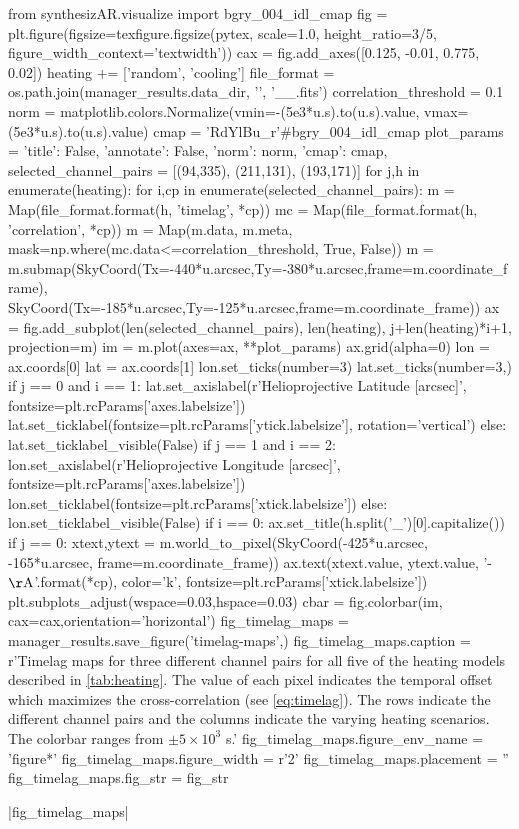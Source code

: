 \begin{pycode}
from synthesizAR.visualize import bgry_004_idl_cmap
fig = plt.figure(figsize=texfigure.figsize(pytex, scale=1.0, height_ratio=3/5,
                                           figure_width_context='textwidth'))
cax = fig.add_axes([0.125, -0.01, 0.775, 0.02])
heating += ['random', 'cooling']
file_format = os.path.join(manager_results.data_dir, '{}', '{}_{}_{}.fits')
correlation_threshold = 0.1
norm = matplotlib.colors.Normalize(vmin=-(5e3*u.s).to(u.s).value,
                                   vmax=(5e3*u.s).to(u.s).value)
cmap = 'RdYlBu_r'#bgry_004_idl_cmap
plot_params = {'title': False, 'annotate': False, 'norm': norm, 'cmap': cmap,}
selected_channel_pairs = [(94,335), (211,131), (193,171)]
for j,h in enumerate(heating):
    for i,cp in enumerate(selected_channel_pairs):
        m = Map(file_format.format(h, 'timelag', *cp))
        mc = Map(file_format.format(h, 'correlation', *cp))
        m = Map(m.data, m.meta, mask=np.where(mc.data<=correlation_threshold, True, False))
        m = m.submap(SkyCoord(Tx=-440*u.arcsec,Ty=-380*u.arcsec,frame=m.coordinate_frame),
                     SkyCoord(Tx=-185*u.arcsec,Ty=-125*u.arcsec,frame=m.coordinate_frame))
        ax = fig.add_subplot(len(selected_channel_pairs), len(heating), j+len(heating)*i+1,
                             projection=m)
        im = m.plot(axes=ax, **plot_params)
        ax.grid(alpha=0)
        lon = ax.coords[0]
        lat = ax.coords[1]
        lon.set_ticks(number=3)
        lat.set_ticks(number=3,) 
        if j == 0 and i == 1:
            lat.set_axislabel(r'Helioprojective Latitude [arcsec]', fontsize=plt.rcParams['axes.labelsize'])
            lat.set_ticklabel(fontsize=plt.rcParams['ytick.labelsize'], rotation='vertical')
        else:
            lat.set_ticklabel_visible(False)
        if j == 1 and i == 2:
            lon.set_axislabel(r'Helioprojective Longitude [arcsec]', fontsize=plt.rcParams['axes.labelsize'])
            lon.set_ticklabel(fontsize=plt.rcParams['xtick.labelsize'])
        else:
            lon.set_ticklabel_visible(False)
        if i == 0:
            ax.set_title(h.split('_')[0].capitalize())
        if j == 0:
            xtext,ytext = m.world_to_pixel(SkyCoord(-425*u.arcsec, -165*u.arcsec, frame=m.coordinate_frame))
            ax.text(xtext.value, ytext.value, '{}-{} $\mathrm{{\AA}}$'.format(*cp),
                    color='k', fontsize=plt.rcParams['xtick.labelsize'])
plt.subplots_adjust(wspace=0.03,hspace=0.03)
cbar = fig.colorbar(im, cax=cax,orientation='horizontal')
fig_timelag_maps = manager_results.save_figure('timelag-maps',)
fig_timelag_maps.caption = r'Timelag maps for three different channel pairs for all five of the heating models described in \autoref{tab:heating}. The value of each pixel indicates the temporal offset which maximizes the cross-correlation (see \autoref{eq:timelag}). The rows indicate the different channel pairs and the columns indicate the varying heating scenarios. The colorbar ranges from $\pm5\times10^3$ s.'
fig_timelag_maps.figure_env_name = 'figure*'
fig_timelag_maps.figure_width = r'2\columnwidth'
fig_timelag_maps.placement = ''
fig_timelag_maps.fig_str = fig_str
\end{pycode}
|fig_timelag_maps|

